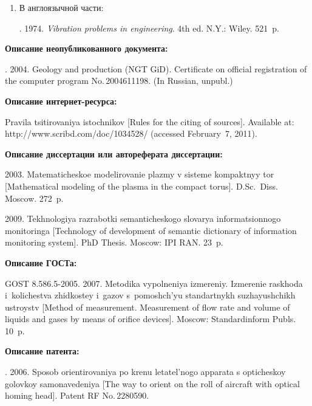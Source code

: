 {\begin{enumerate}[1.]
{\begin{enumerate}[1.]
Колебания в инженерном деле~/ Пер.\ с англ.~--- М.: Машиностроение, 1985. 472~с.
(
Vibration problems in engineering.~--- 4th ed.~--- N.Y.: Wiley, 1974. 521~p.)
\item  В англоязычной части:

.
1974. \textit{Vibration problems in engineering}. 4th ed. N.Y.: Wiley. 521~p.
\end{enumerate}


\noindent
\textbf{Описание неопубликованного документа:}

.
2004. Geology and production (NGT GiD). Certificate on official registration of the computer program
No.\,2004611198. (In Russian, unpubl.)

\noindent
\textbf{Описание интернет-ресурса:}


Pravila tsitirovaniya istochnikov [Rules for the citing of sources]. Available at: {\sf
http://www.scribd.com/doc/1034528/} (accessed February~7, 2011).


\noindent
\textbf{Описание диссертации или автореферата диссертации:}

2003. Matematicheskoe modelirovanie plazmy v sisteme kompaktnyy tor [Mathematical
modeling of the plasma in the compact torus]. D.Sc.\ Diss. Moscow. 272~p.

 2009. Tekhnologiya razrabotki semanticheskogo
slovarya informatsionnogo monitoringa [Technology of development of
semantic dictionary of information monitoring system]. PhD Thesis. Moscow: IPI RAN. 23~p.


\noindent
\textbf{Описание ГОСТа:}

GOST 8.586.5-2005. 2007. Metodika vypolneniya izmereniy. Izmerenie raskhoda i~kolichestva zhidkostey i~gazov
s~pomoshch'yu standartnykh suzhayushchikh ustroystv [Method of measurement.
Measurement of flow rate and volume of liquids and gases by means of orifice devices]. Moscow:
Standardinform  Publs. 10~p.

\noindent
\textbf{Описание патента:}

.
2006. Sposob orientirovaniya po krenu letatel'nogo
apparata s opti\-che\-skoy golovkoy
samonavedeniya [The way to orient on the roll of aircraft with optical homing head].
Patent RF No.\,2280590.
}


\end{enumerate}}
